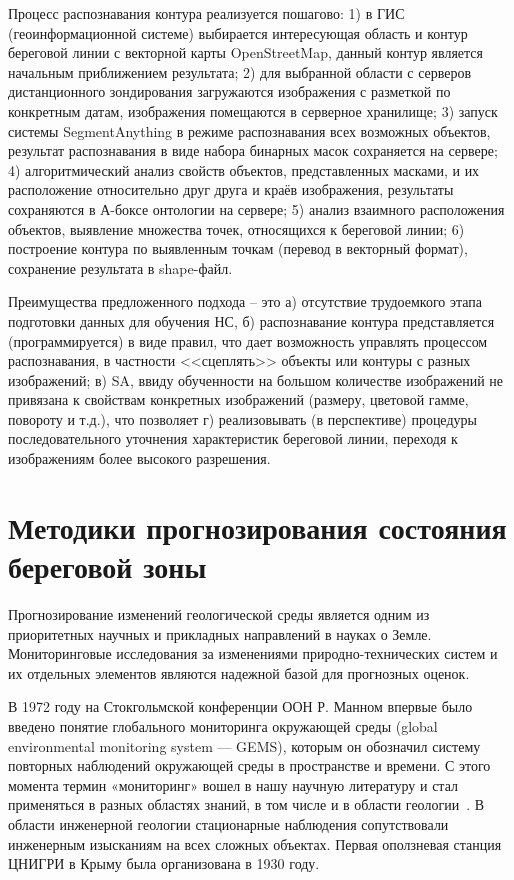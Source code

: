 \documentclass[732,fontsize=14pt,final]{studrep}
\begin{document}
Процесс распознавания контура реализуется пошагово: 1) в ГИС (геоинформационной системе) выбирается интересующая область и контур береговой линии с векторной карты OpenStreetMap, данный контур является начальным приближением результата; 2) для выбранной области с серверов дистанционного зондирования загружаются изображения с разметкой по конкретным датам, изображения помещаются в серверное хранилище; 3) запуск системы SegmentAnything в режиме распознавания всех возможных объектов, результат распознавания в виде набора бинарных масок сохраняется на сервере; 4) алгоритмический анализ свойств объектов, представленных масками, и их расположение относительно друг друга и краёв изображения, результаты сохраняются в А-боксе онтологии на сервере; 5) анализ взаимного расположения объектов, выявление множества точек, относящихся к береговой линии; 6) построение контура по выявленным точкам (перевод в векторный формат), сохранение результата в shape-файл.

Преимущества предложенного подхода -- это а) отсутствие трудоемкого этапа подготовки данных для обучения НС, б) распознавание контура представляется (программируется) в виде правил, что дает возможность управлять процессом распознавания, в частности <<сцеплять>> объекты или контуры с разных изображений; в) SA, ввиду обученности на большом количестве изображений не привязана к свойствам конкретных изображений (размеру, цветовой гамме, повороту и т.д.), что позволяет г) реализовывать (в перспективе) процедуры последовательного уточнения характеристик береговой линии, переходя к изображениям более высокого разрешения.

\chapter{Методики прогнозирования состояния береговой зоны}\label{chap:techniques}

Прогнозирование изменений геологической среды является одним из приоритетных научных и прикладных направлений в науках о Земле. Мониторинговые исследования за изменениями природно-технических систем и их отдельных элементов являются надежной базой для прогнозных оценок.

В 1972 году на Стокгольмской конференции ООН Р. Манном впервые было введено понятие глобального мониторинга окружающей среды (global environmental monitoring system — GEMS), которым он обозначил систему повторных наблюдений окружающей среды в пространстве и времени. С этого момента термин «мониторинг» вошел в нашу научную литературу и стал применяться в разных областях знаний, в том числе и в области геологии~\cite{ivanov01}. В области инженерной геологии стационарные наблюдения сопутствовали инженерным изысканиям на всех сложных объектах. Первая оползневая станция ЦНИГРИ в Крыму была организована в 1930 году.
\end{document}
